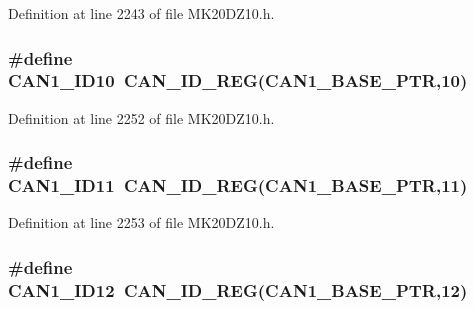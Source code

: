Definition at line 2243 of file M\+K20\+D\+Z10.\+h.

\subsubsection[{\texorpdfstring{C\+A\+N1\+\_\+\+I\+D10}{CAN1_ID10}}]{\setlength{\rightskip}{0pt plus 5cm}\#define C\+A\+N1\+\_\+\+I\+D10~{\bf C\+A\+N\+\_\+\+I\+D\+\_\+\+R\+EG}({\bf C\+A\+N1\+\_\+\+B\+A\+S\+E\+\_\+\+P\+TR},10)}\hypertarget{group___c_a_n___register___accessor___macros_gacf73c5656890a6f4efb51add60dc85fd}{}\label{group___c_a_n___register___accessor___macros_gacf73c5656890a6f4efb51add60dc85fd}


Definition at line 2252 of file M\+K20\+D\+Z10.\+h.

\subsubsection[{\texorpdfstring{C\+A\+N1\+\_\+\+I\+D11}{CAN1_ID11}}]{\setlength{\rightskip}{0pt plus 5cm}\#define C\+A\+N1\+\_\+\+I\+D11~{\bf C\+A\+N\+\_\+\+I\+D\+\_\+\+R\+EG}({\bf C\+A\+N1\+\_\+\+B\+A\+S\+E\+\_\+\+P\+TR},11)}\hypertarget{group___c_a_n___register___accessor___macros_ga60f3b72a5e79045ff5278a520f1aed0e}{}\label{group___c_a_n___register___accessor___macros_ga60f3b72a5e79045ff5278a520f1aed0e}


Definition at line 2253 of file M\+K20\+D\+Z10.\+h.

\subsubsection[{\texorpdfstring{C\+A\+N1\+\_\+\+I\+D12}{CAN1_ID12}}]{\setlength{\rightskip}{0pt plus 5cm}\#define C\+A\+N1\+\_\+\+I\+D12~{\bf C\+A\+N\+\_\+\+I\+D\+\_\+\+R\+EG}({\bf C\+A\+N1\+\_\+\+B\+A\+S\+E\+\_\+\+P\+TR},12)}\hypertarget{group___c_a_n___register___accessor___macros_ga09c73450aaffe54318eec304473eae2b}{}\label{group___c_a_n___register___accessor___macros_ga09c73450aaffe54318eec304473eae2b}


